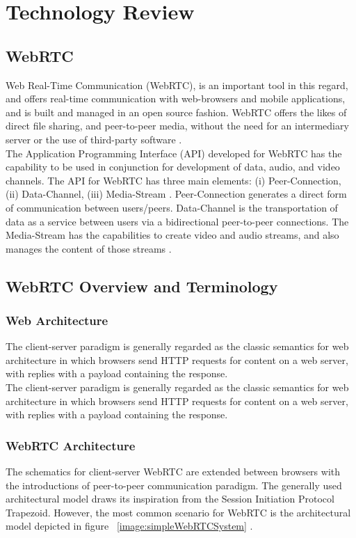 \chapter{Technology Review}

\section{WebRTC}
Web Real-Time Communication (WebRTC), is an important tool in this regard, and offers real-time communication with web-browsers and mobile applications, and is built and managed in an open source fashion. WebRTC offers the likes of direct file sharing, and peer-to-peer media, without the need for an intermediary server or the use of third-party software \cite{johnston2012webrtc}. 
\\The Application Programming Interface (API) developed for WebRTC has the capability to be used in conjunction for development of data, audio, and video channels. The API for WebRTC has three main elements: (i) Peer-Connection, (ii) Data-Channel, (iii) Media-Stream \cite{jesup2015webrtc}. Peer-Connection generates a direct form of communication between users/peers. Data-Channel is the transportation of data as a service between users via a bidirectional peer-to-peer connections. The Media-Stream has the capabilities  to create video and audio streams, and also manages the content of those streams \cite{14003034520191201}.

\section{WebRTC Overview and Terminology}
\subsection{Web Architecture}
The client-server paradigm is generally regarded as the classic semantics for web architecture in which browsers send HTTP requests for content on a web server, with replies with a payload containing the response.
\\The client-server paradigm is generally regarded as the classic semantics for web architecture in which browsers send HTTP requests for content on a web server, with replies with a payload containing the response.

\subsection{WebRTC Architecture}
The schematics for client-server WebRTC are extended between browsers with the introductions of peer-to-peer communication paradigm. The generally used architectural model draws its inspiration from the Session Initiation Protocol Trapezoid. However, the most common scenario for WebRTC is the architectural model depicted in figure ~\ref{image:simpleWebRTCSystem} \cite{loreto2014real}.

